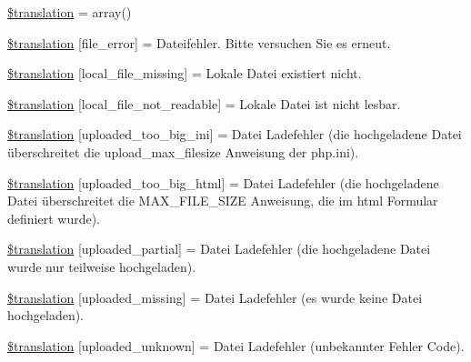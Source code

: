 \begin{DoxyCompactItemize}
\item 
\hyperlink{class_8upload_8de___d_e_8php_a1f198d410fecc3871ebdd468d343a5e3}{\$translation} = array()
\item 
\hyperlink{class_8upload_8de___d_e_8php_ac7498e49b9771b04698029aa61c70821}{\$translation} \mbox{[}\textquotesingle{}file\+\_\+error\textquotesingle{}\mbox{]} = \textquotesingle{}Dateifehler. Bitte versuchen Sie es erneut.\textquotesingle{}
\item 
\hyperlink{class_8upload_8de___d_e_8php_a6ec3d3a47ab70d77e7aa593e82ead10e}{\$translation} \mbox{[}\textquotesingle{}local\+\_\+file\+\_\+missing\textquotesingle{}\mbox{]} = \textquotesingle{}Lokale Datei existiert nicht.\textquotesingle{}
\item 
\hyperlink{class_8upload_8de___d_e_8php_a60104befef9b241f3a7a6a755618a4b3}{\$translation} \mbox{[}\textquotesingle{}local\+\_\+file\+\_\+not\+\_\+readable\textquotesingle{}\mbox{]} = \textquotesingle{}Lokale Datei ist nicht lesbar.\textquotesingle{}
\item 
\hyperlink{class_8upload_8de___d_e_8php_a6a08dcd0d3651fdd098568f6b2f0a42c}{\$translation} \mbox{[}\textquotesingle{}uploaded\+\_\+too\+\_\+big\+\_\+ini\textquotesingle{}\mbox{]} = \textquotesingle{}Datei Ladefehler (die hochgeladene Datei überschreitet die upload\+\_\+max\+\_\+filesize Anweisung der php.\+ini).\textquotesingle{}
\item 
\hyperlink{class_8upload_8de___d_e_8php_a623d5b8b92169f57d7e43458aa911cbb}{\$translation} \mbox{[}\textquotesingle{}uploaded\+\_\+too\+\_\+big\+\_\+html\textquotesingle{}\mbox{]} = \textquotesingle{}Datei Ladefehler (die hochgeladene Datei überschreitet die M\+A\+X\+\_\+\+F\+I\+L\+E\+\_\+\+S\+I\+Z\+E Anweisung, die im html Formular definiert wurde).\textquotesingle{}
\item 
\hyperlink{class_8upload_8de___d_e_8php_a967c17da21b0a2d3bd65cca3a9ca0ea8}{\$translation} \mbox{[}\textquotesingle{}uploaded\+\_\+partial\textquotesingle{}\mbox{]} = \textquotesingle{}Datei Ladefehler (die hochgeladene Datei wurde nur teilweise hochgeladen).\textquotesingle{}
\item 
\hyperlink{class_8upload_8de___d_e_8php_a0cce433260be65f1f35853a6b4b8952b}{\$translation} \mbox{[}\textquotesingle{}uploaded\+\_\+missing\textquotesingle{}\mbox{]} = \textquotesingle{}Datei Ladefehler (es wurde keine Datei hochgeladen).\textquotesingle{}
\item 
\hyperlink{class_8upload_8de___d_e_8php_a4a9168e922b827e6a28b5db1c00774ca}{\$translation} \mbox{[}\textquotesingle{}uploaded\+\_\+unknown\textquotesingle{}\mbox{]} = \textquotesingle{}Datei Ladefehler (unbekannter Fehler Code).\textquotesingle{}

\end{DoxyCompactItemize}
